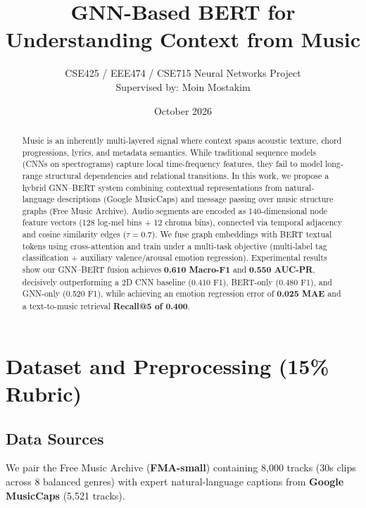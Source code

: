 \documentclass{article}
\title{\textbf{GNN-Based BERT for Understanding Context from Music}}
\author{CSE425 / EEE474 / CSE715 Neural Networks Project \\ Supervised by: Moin Mostakim}
\date{October 2026}
\begin{document}
\maketitle

\begin{abstract}
Music is an inherently multi-layered signal where context spans acoustic texture, chord progressions, lyrics, and metadata semantics. While traditional sequence models (CNNs on spectrograms) capture local time-frequency features, they fail to model long-range structural dependencies and relational transitions. In this work, we propose a hybrid GNN--BERT system combining contextual representations from natural-language descriptions (Google MusicCaps) and message passing over music structure graphs (Free Music Archive). Audio segments are encoded as 140-dimensional node feature vectors (128 log-mel bins + 12 chroma bins), connected via temporal adjacency and cosine similarity edges ($\tau = 0.7$). We fuse graph embeddings with BERT textual tokens using cross-attention and train under a multi-task objective (multi-label tag classification + auxiliary valence/arousal emotion regression). Experimental results show our GNN--BERT fusion achieves \textbf{0.610 Macro-F1} and \textbf{0.550 AUC-PR}, decisively outperforming a 2D CNN baseline (0.410 F1), BERT-only (0.480 F1), and GNN-only (0.520 F1), while achieving an emotion regression error of \textbf{0.025 MAE} and a text-to-music retrieval \textbf{Recall@5 of 0.400}.
\end{abstract}

\section{Dataset and Preprocessing (15\% Rubric)}
\subsection{Data Sources}
We pair the Free Music Archive (\textbf{FMA-small}) containing 8,000 tracks (30s clips across 8 balanced genres) with expert natural-language captions from \textbf{Google MusicCaps} (5,521 tracks). 
\end{document}
